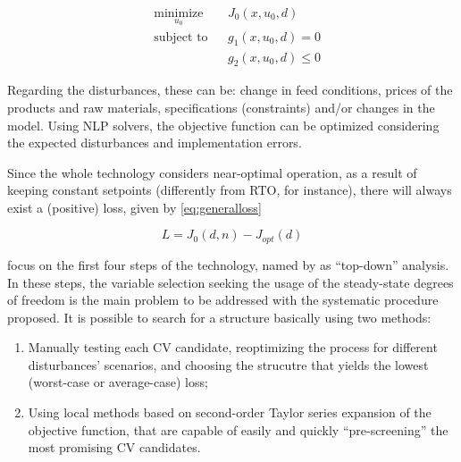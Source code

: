 \documentclass[../msc-thesis.tex]{subfiles}
\begin{document}
\begin{equation}
	\begin{aligned}
	& \underset{u_{0}}{\text{minimize}}
	& & J_{0}\left(x, u_{0}, d\right) \\
	& \text{subject to}
	& & g_{1}\left(x, u_{0}, d\right)=0 \\
	& & & g_{2}\left(x, u_{0}, d\right) \leq 0
	\end{aligned}
    \label{soc:optproblem}
\end{equation}

Regarding the disturbances, these can be: change in feed conditions, prices 
of the products and raw materials, specifications (constraints) and/or changes 
in the model. Using NLP solvers, the objective function can be optimized 
considering the expected disturbances and implementation errors.

Since the whole technology considers near-optimal operation, as a result of 
keeping constant setpoints (differently from RTO, for instance), there will 
always exist a (positive) loss, given by \autoref{eq:generalloss}

\begin{equation}
	L=J_{0}(d, n)-J_{opt}(d)
	\label{eq:generalloss}
\end{equation}

\mtc focus on the first four steps of the \soc technology, named by 
\textcite{Skogestad2000} as ``top-down'' analysis. In these steps, the 
variable selection seeking the usage of the steady-state degrees of freedom 
is the main problem to be addressed with the systematic procedure proposed. It 
is possible to search for a \soc structure basically using two methods:

\begin{enumerate}
    \item Manually testing each CV candidate, reoptimizing the process for 
	different disturbances' scenarios, and choosing the strucutre that yields 
	the lowest (worst-case or average-case) loss; \label{soc:method1}

	\item Using local methods based on second-order Taylor series expansion of 
    the objective function, that are capable of easily and quickly 
    ``pre-screening'' the most promising CV candidates. \label{soc:method2}
\end{enumerate}
\end{document}
